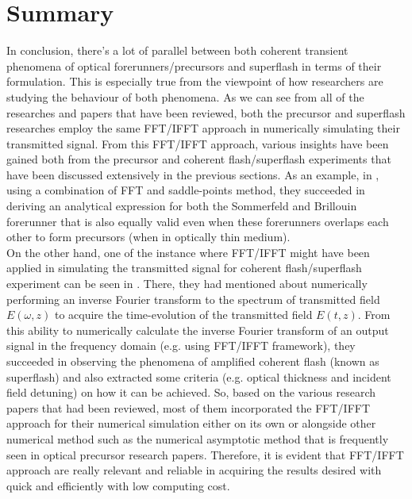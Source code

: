 \chapter{Summary}
In conclusion, there's a lot of parallel between both coherent transient phenomena of optical forerunners/precursors and superflash in terms of their formulation. This is especially true from the viewpoint of how researchers are studying the behaviour of both phenomena. As we can see from all of the researches and papers that have been reviewed, both the precursor and superflash researches employ the same FFT/IFFT approach in numerically simulating their transmitted signal. From this FFT/IFFT approach, various insights have been gained both from the precursor and coherent flash/superflash experiments that have been discussed extensively in the previous sections. As an example, in \cite{Macke2013}, using a combination of FFT and saddle-points method, they succeeded in deriving an analytical expression for both the Sommerfeld and Brillouin forerunner that is also equally valid even when these forerunners overlaps each other to form precursors (when in optically thin medium).\\

On the other hand, one of the instance where FFT/IFFT might have been applied in simulating the transmitted signal for coherent flash/superflash experiment can be seen in \cite{Kwong2014}. There, they had mentioned about numerically performing an inverse Fourier transform to the spectrum of transmitted field $E(\omega, z)$ to acquire the time-evolution of the transmitted field $E(t, z)$. From this ability to numerically calculate the inverse Fourier transform of an output signal in the frequency domain (e.g. using FFT/IFFT framework), they succeeded in observing the phenomena of amplified coherent flash (known as superflash) and also extracted some criteria (e.g. optical thickness and incident field detuning) on how it can be achieved. So, based on the various research papers that had been reviewed, most of them incorporated the FFT/IFFT approach for their numerical simulation either on its own or alongside other numerical method such as the numerical asymptotic method that is frequently seen in optical precursor research papers. Therefore, it is evident that FFT/IFFT approach are really relevant and reliable in acquiring the results desired with quick and efficiently with low computing cost.\\


